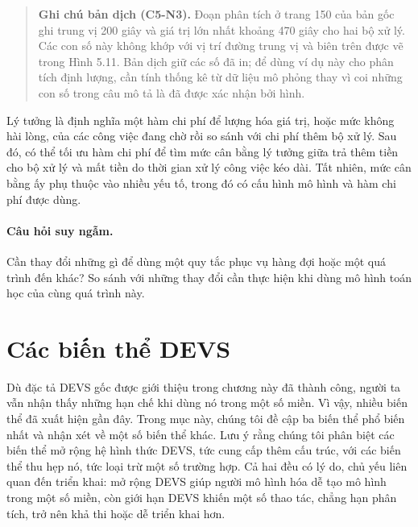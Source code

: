 \begin{quote}\small
\textbf{Ghi chú bản dịch (C5-N3).} Đoạn phân tích ở trang 150 của bản gốc ghi trung vị 200 giây và giá trị lớn nhất khoảng 470 giây cho hai bộ xử lý. Các con số này không khớp với vị trí đường trung vị và biên trên được vẽ trong Hình 5.11. Bản dịch giữ các số đã in; để dùng ví dụ này cho phân tích định lượng, cần tính thống kê từ dữ liệu mô phỏng thay vì coi những con số trong câu mô tả là đã được xác nhận bởi hình.
\end{quote}


Lý tưởng là định nghĩa một hàm chi phí để lượng hóa giá trị, hoặc mức không hài lòng, của các công việc đang chờ rồi so sánh với chi phí thêm bộ xử lý. Sau đó, có thể tối ưu hàm chi phí để tìm mức cân bằng lý tưởng giữa trả thêm tiền cho bộ xử lý và mất tiền do thời gian xử lý công việc kéo dài. Tất nhiên, mức cân bằng ấy phụ thuộc vào nhiều yếu tố, trong đó có cấu hình mô hình và hàm chi phí được dùng.

\paragraph{Câu hỏi suy ngẫm.} Cần thay đổi những gì để dùng một quy tắc phục vụ hàng đợi hoặc một quá trình đến khác? So sánh với những thay đổi cần thực hiện khi dùng mô hình toán học của cùng quá trình này.

\clearpage
\section{Các biến thể DEVS}
Dù đặc tả DEVS gốc được giới thiệu trong chương này đã thành công, người ta vẫn nhận thấy những hạn chế khi dùng nó trong một số miền. Vì vậy, nhiều biến thể đã xuất hiện gần đây. Trong mục này, chúng tôi đề cập ba biến thể phổ biến nhất và nhận xét về một số biến thể khác. Lưu ý rằng chúng tôi phân biệt các biến thể mở rộng hệ hình thức DEVS, tức cung cấp thêm cấu trúc, với các biến thể thu hẹp nó, tức loại trừ một số trường hợp. Cả hai đều có lý do, chủ yếu liên quan đến triển khai: mở rộng DEVS giúp người mô hình hóa dễ tạo mô hình trong một số miền, còn giới hạn DEVS khiến một số thao tác, chẳng hạn phân tích, trở nên khả thi hoặc dễ triển khai hơn.

